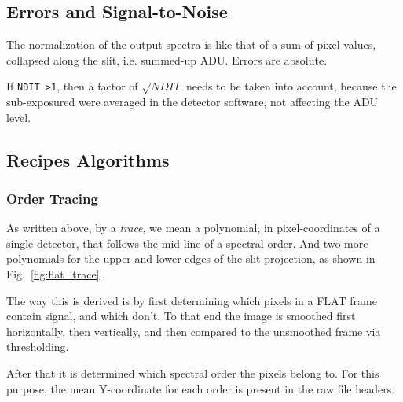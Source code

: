 
\subsection{Errors and Signal-to-Noise}
\label{sec:errors}


The normalization of the output-spectra is like that of a sum of pixel values,
collapsed along the slit, i.e. summed-up ADU. Errors are absolute.

If \verb!NDIT >1!, then a factor of $\sqrt{NDIT}$ needs to be taken into account,
because the sub-exposured were averaged in the detector software, not affecting
the ADU level.

\subsection{Recipes Algorithms} 
\label{sec:algorithms-recipes}



\subsubsection{Order Tracing}
\label{sec:ordertrace}

As written above, by a \emph{trace}, we mean a polynomial, in pixel-coordinates of a single detector, that follows the mid-line of a spectral order. And two more polynomials for the upper and lower edges of the slit projection, as shown in Fig.~\ref{fig:flat_trace}.

The way this is derived is by first determining which pixels in a FLAT frame contain signal, and which don't. To that end the image is smoothed first horizontally, then vertically, and then compared to the unsmoothed frame via thresholding.

After that it is determined which spectral order the pixels belong to. For this purpose, the mean Y-coordinate for each order is present in the raw file headers.

